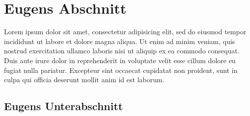 \section{Eugens Abschnitt}
\renewcommand\mitautor{Eugen XXXXXX}

Lorem ipsum dolor sit amet, consectetur adipisicing elit, sed do eiusmod
tempor incididunt ut labore et dolore magna aliqua. Ut enim ad minim veniam,
quis nostrud exercitation ullamco laboris nisi ut aliquip ex ea commodo
consequat. Duis aute irure dolor in reprehenderit in voluptate velit esse
cillum dolore eu fugiat nulla pariatur. Excepteur sint occaecat cupidatat non
proident, sunt in culpa qui officia deserunt mollit anim id est laborum.

\subsection{Eugens Unterabschnitt}


\newpage
